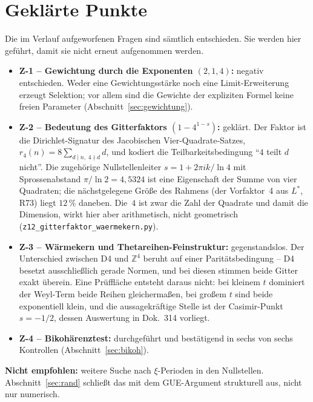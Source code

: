 \section{Gekl\"arte Punkte}

Die im Verlauf aufgeworfenen Fragen sind s\"amtlich entschieden. Sie
werden hier gef\"uhrt, damit sie nicht erneut aufgenommen werden.

\begin{itemize}
  \item \textbf{Z-1 -- Gewichtung durch die Exponenten $(2,1,4)$:}
    negativ entschieden. Weder eine Gewichtungsst\"arke noch eine
    Limit-Erweiterung erzeugt Selektion; vor allem sind die Gewichte
    der expliziten Formel keine freien Parameter
    (Abschnitt~\ref{sec:gewichtung}).
  \item \textbf{Z-2 -- Bedeutung des Gitterfaktors $(1-4^{1-s})$:}
    gekl\"art. Der Faktor ist die Dirichlet-Signatur des Jacobischen
    Vier-Quadrate-Satzes,
    $r_4(n) = 8\sum_{d\mid n,\;4\nmid d} d$, und kodiert die
    Teilbarkeitsbedingung \enquote{$4$ teilt $d$ nicht}. Die
    zugeh\"orige Nullstellenleiter
    $s = 1 + 2\pi i k/\ln 4$ mit Sprossenabstand
    $\pi/\ln 2 = 4{,}5324$ ist eine Eigenschaft der Summe von vier
    Quadraten; die n\"achstgelegene Gr\"o\ss e des Rahmens (der
    Vorfaktor~4 aus $L^{*}$, R73) liegt $12\,\%$ daneben. Die~$4$ ist
    zwar die Zahl der Quadrate und damit die Dimension, wirkt hier
    aber arithmetisch, nicht geometrisch
    (\texttt{z12\_gitterfaktor\_waermekern.py}).
  \item \textbf{Z-3 -- W\"armekern und Thetareihen-Feinstruktur:}
    gegenstandslos. Der Unterschied zwischen D4 und $\mathbb{Z}^4$
    beruht auf einer Parit\"atsbedingung -- D4 besetzt ausschlie\ss lich
    gerade Normen, und bei diesen stimmen beide Gitter exakt \"uberein.
    Eine Pr\"uffl\"ache entsteht daraus nicht: bei kleinem $t$
    dominiert der Weyl-Term beide Reihen gleicherma\ss en, bei gro\ss em
    $t$ sind beide exponentiell klein, und die aussagekr\"aftige Stelle
    ist der Casimir-Punkt $s = -1/2$, dessen Auswertung in Dok.~314
    vorliegt.
  \item \textbf{Z-4 -- Bikoh\"arenztest:} durchgef\"uhrt und
    best\"atigend in sechs von sechs Kontrollen
    (Abschnitt~\ref{sec:bikoh}).
\end{itemize}

\textbf{Nicht empfohlen:} weitere Suche nach $\xi$-Perioden in den
Nullstellen. Abschnitt~\ref{sec:rand} schlie\ss t das mit dem
GUE-Argument strukturell aus, nicht nur numerisch.

